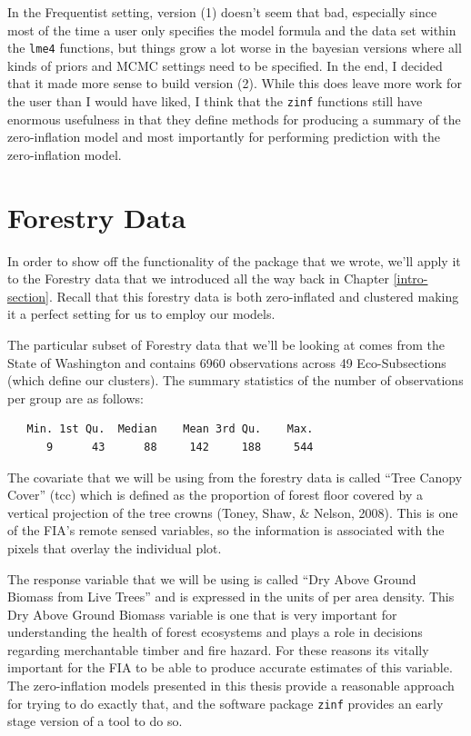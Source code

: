 \documentclass[12pt,twoside]{reedthesis}
\begin{document}
In the Frequentist setting, version (1) doesn't seem that bad, especially since most of the time a user only specifies the model formula and the data set within the \texttt{lme4} functions, but things grow a lot worse in the bayesian versions where all kinds of priors and MCMC settings need to be specified. In the end, I decided that it made more sense to build version (2). While this does leave more work for the user than I would have liked, I think that the \texttt{zinf} functions still have enormous usefulness in that they define methods for producing a summary of the zero-inflation model and most importantly for performing prediction with the zero-inflation model.

\hypertarget{forestry-data}{%
\section{Forestry Data}\label{forestry-data}}

In order to show off the functionality of the package that we wrote, we'll apply it to the Forestry data that we introduced all the way back in Chapter \ref{intro-section}. Recall that this forestry data is both zero-inflated and clustered making it a perfect setting for us to employ our models.

The particular subset of Forestry data that we'll be looking at comes from the State of Washington and contains 6960 observations across 49 Eco-Subsections (which define our clusters). The summary statistics of the number of observations per group are as follows:
\begin{verbatim}
   Min. 1st Qu.  Median    Mean 3rd Qu.    Max. 
      9      43      88     142     188     544 
\end{verbatim}
The covariate that we will be using from the forestry data is called ``Tree Canopy Cover'' (tcc) which is defined as the proportion of forest floor covered by a vertical projection of the tree crowns (Toney, Shaw, \& Nelson, 2008). This is one of the FIA's remote sensed variables, so the information is associated with the pixels that overlay the individual plot.

The response variable that we will be using is called ``Dry Above Ground Biomass from Live Trees'' and is expressed in the units of per area density. This Dry Above Ground Biomass variable is one that is very important for understanding the health of forest ecosystems and plays a role in decisions regarding merchantable timber and fire hazard. For these reasons its vitally important for the FIA to be able to produce accurate estimates of this variable. The zero-inflation models presented in this thesis provide a reasonable approach for trying to do exactly that, and the software package \texttt{zinf} provides an early stage version of a tool to do so.
\end{document}
